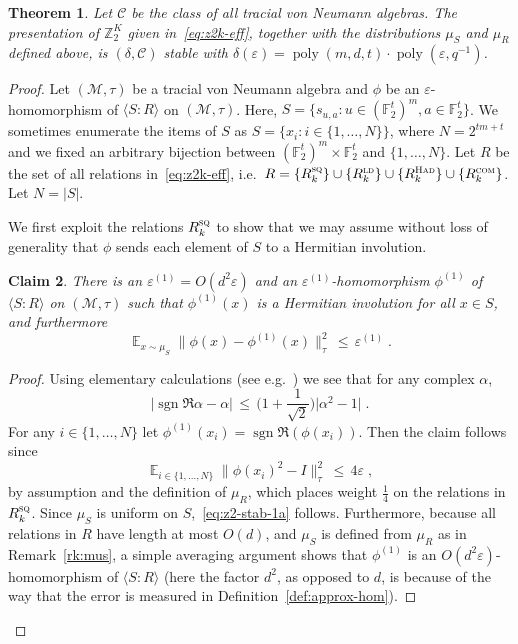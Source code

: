 \documentclass[11pt]{article}
\newtheorem{theorem}{Theorem}[section]
\newtheorem{claim}[theorem]{Claim}
\theoremstyle{definition}
\newcommand{\Id}{\ensuremath{I}}
\DeclareMathOperator*{\Expectation}{\mathbb{E}}
\newcommand{\Es}[1]{\Expectation_{#1}}
\newcommand{\F}{\ensuremath{\mathbb{F}}}
\newcommand{\ld}{\textsc{ld}}
\newcommand{\com}{\textsc{com}}
\newcommand{\sq}{\textsc{sq}}
\newcommand{\Z}{\ensuremath{\mathbb{Z}}}
\newcommand{\mC}{\ensuremath{\mathcal{C}}}
\newcommand{\mM}{\ensuremath{\mathcal{M}}}
\DeclareMathOperator{\poly}{poly}
\newcommand{\had}{\textsc{Had}}
\newcommand{\eps}{\varepsilon}
\DeclareMathOperator{\sgn}{sgn}
\begin{document}
\begin{theorem}\label{thm:z2-stab}
Let $\mC$ be the class of all tracial von Neumann algebras. 
The presentation of  $\Z_2^K$ given in~\eqref{eq:z2k-eff}, together with the distributions $\mu_S$ and $\mu_R$ defined above, is $(\delta,\mC)$ stable with $\delta(\eps)=\poly(m,d,t) \cdot\poly(\eps,q^{-1})$. 
\end{theorem}


\begin{proof}
Let $(\mM,\tau)$ be a tracial von Neumann algebra and $\phi$ be an $\eps$-homomorphism of $\langle S:R\rangle$ on $(\mM,\tau)$. 
 Here, $S = \{s_{u,a}: u\in (\F_2^t)^m, a\in \F_2^t\}$. We sometimes enumerate the items of $S$ as $S=\{x_i: i\in\{1,\ldots,N\}\}$, where $N=2^{tm+t}$ and we fixed an arbitrary bijection between $(\F_2^t)^m\times \F_2^t$ and $\{1,\ldots,N\}$. Let $R$ be the set of all relations in~\eqref{eq:z2k-eff}, i.e.\ $R= \{R_k^\sq\}\cup \{R^\ld_k\}\cup\{R^\had_k\}\cup\{R^\com_k\}$. Let $N=|S|$.

We first exploit the relations $R_k^\sq$ to show that we may assume without loss of generality that $\phi$ sends each element of $S$ to a Hermitian involution. 

\begin{claim}\label{claim:z2-stab-1}
There is an $\eps^{(1)}=O(d^2\eps)$ and an $\eps^{(1)}$-homomorphism $\phi^{(1)}$ of $\langle S:R\rangle$ on $(\mM,\tau)$ such that $\phi^{(1)}(x)$ is a Hermitian involution for all $x\in S$, and furthermore
\begin{equation}\label{eq:z2-stab-1a}
 \Es{x\sim\mu_S} \big\| \phi(x) - \phi^{(1)}(x) \big\|_\tau^2 \,\leq\, \eps^{(1)}\;.
\end{equation}
\end{claim}

\begin{proof}
Using elementary calculations (see e.g.~\cite[Lemma 3.6]{slofstra2019set}) we see that for any complex $\alpha$, 
\[ \big| \sgn\Re\alpha-\alpha\big| \,\leq\, \Big(1+\frac{1}{\sqrt{2}}\Big) \big|\alpha^2 -1 \big|\;.\]
For any $i\in \{1,\ldots,N\}$ let $\phi^{(1)}(x_i) = \sgn\Re (\phi(x_i))$. Then the claim follows since 
\[ \Es{i\in\{1,\ldots,N\}} \big\| \phi(x_i)^2-\Id \big\|_\tau^2 \,\leq\, 4\eps\;,\]
by assumption and the definition of $\mu_R$, which places weight $\frac{1}{4}$ on the relations in $R_k^\sq$. Since $\mu_S$ is uniform on $S$,~\eqref{eq:z2-stab-1a} follows. Furthermore, because all relations in $R$ have length at most $O(d)$, and $\mu_S$ is defined from $\mu_R$ as in Remark~\ref{rk:mus}, a simple averaging argument shows that $\phi^{(1)}$ is an $O(d^2\eps)$-homomorphism of $\langle S:R\rangle$ (here the factor $d^2$, as opposed to $d$, is because of the way that the error is measured in Definition~\ref{def:approx-hom}).
\end{proof}


\end{proof}
\end{document}
